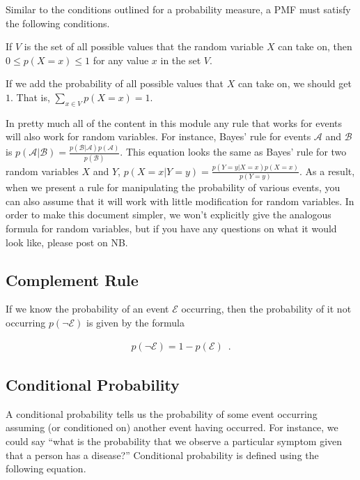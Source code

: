 \documentclass{tufte-handout}
\begin{document}
Similar to the conditions outlined for a probability measure, a PMF must satisfy the following conditions.
\be
\item If $V$ is the set of all possible values that the random variable $X$ can take on, then $0 \leq p(X = x) \leq 1$ for any value $x$ in the set $V$.
\item If we add the probability of all possible values that $X$ can take on, we should get $1$.  That is, $\sum_{x \in V} p(X = x) = 1$.
\ee

\begin{notice}
In pretty much all of the content in this module any rule that works for events will also work for random variables.  For instance, Bayes' rule for events $\mathcal{A}$ and $\mathcal{B}$ is $p(\mathcal{A} | \mathcal{B}) = \frac{p(\mathcal{B}|\mathcal{A}) p(\mathcal{A})}{p(\mathcal{B})}$.  This equation looks the same as Bayes' rule for two random variables $X$ and $Y$, $p(X=x | Y=y) = \frac{p(Y=y|X=x) p(X=x)}{p(Y=y)}$.  As a result, when we present a rule for manipulating the probability of various events, you can also assume that it will work with little modification for random variables.  In order to make this document simpler, we won't explicitly give the analogous formula for random variables, but if you have any questions on what it would look like, please post on NB.
\end{notice}

\subsection{Complement Rule}

If we know the probability of an event $\mathcal{E}$ occurring, then the probability of it not occurring $p(\neg \mathcal{E})$ is given by the formula

\begin{align}
p(\neg \mathcal{E}) = 1 - p(\mathcal{E}) \enspace .
\end{align}

\subsection{Conditional Probability}
A conditional probability tells us the probability of some event occurring assuming (or conditioned on) another event having occurred.  For instance, we could say ``what is the probability that we observe a particular symptom given that a person has a disease?''  Conditional probability is defined using the following equation.
\end{document}
